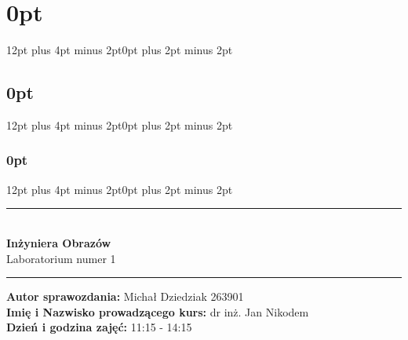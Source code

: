 % 
% 

\usepackage[margin = 0.7in]{geometry}
\usepackage{graphicx}
\usepackage{graphics}
\usepackage[T1]{fontenc}
\usepackage[polish]{babel}
\usepackage{cmap}
\usepackage[utf8]{inputenc}
\usepackage{float}
\usepackage{tabularx}
\usepackage[table,xcdraw]{xcolor}
\usepackage{lipsum}
\usepackage{titlesec}
\usepackage{minted}
\usepackage{xcolor}
\usepackage{caption}
\usepackage{enumitem}
\usepackage{csvsimple}
\usepackage{natbib}
\usepackage{blindtext}

\usepackage{numprint} %
\usepackage[round-precision=3,round-mode=figures, scientific-notation=true]{siunitx} %

\usepackage[hidelinks]{hyperref}
\usepackage{url}

\usepackage{bm} %


\usepackage[]{booktabs}
\usepackage{tabularray}
\usepackage{multirow}

\author{Michał Dziedziak}
\date{\today}


\titlespacing\section{0pt}{12pt plus 4pt minus 2pt}{0pt plus 2pt minus 2pt}
\titlespacing\subsection{0pt}{12pt plus 4pt minus 2pt}{0pt plus 2pt minus 2pt}
\titlespacing\subsubsection{0pt}{12pt plus 4pt minus 2pt}{0pt plus 2pt minus 2pt}
\setlength{\parskip}{\baselineskip}%
\setlength{\parindent}{0pt}%

\newcommand{\squeezeup}{\vspace{-5mm}}




\begin{titlepage}
    \begin{center}
        \vspace*{5cm}
        \rule{500pt}{1pt}\\
        \vspace*{0.5cm}
        \LARGE
        \textbf{Inżyniera Obrazów}\\
        \Large
        Laboratorium numer 1
        \vspace*{0.5cm}
        \rule{500pt}{1pt}
    \end{center}

    \vspace*{10cm}

    {\raggedright
        \large
        \textbf{Autor sprawozdania:} Michał Dziedziak 263901\\
        \textbf{Imię i Nazwisko prowadzącego kurs:} dr inż. Jan Nikodem\\
        \textbf{Dzień i godzina zajęć:} 11:15 - 14:15
    }
\end{titlepage}


